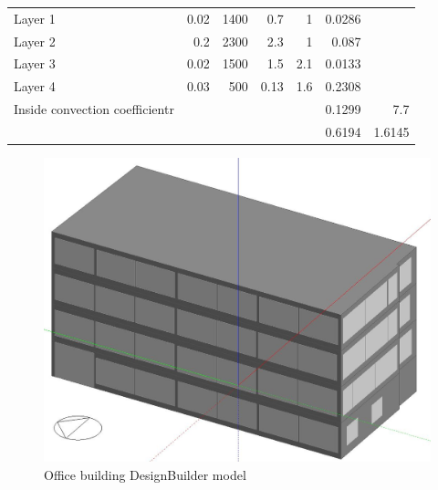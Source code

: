 \documentclass[a4paper, oneside]{discothesis}
\begin{document}
\begin{table}[h!]
\begin{tabular}{rrrrrrr}
			    \multicolumn{1}{l}{Layer 1} & 0.02 & 1400 & 0.7  & 1    & 0.0286 &  \\
			    \multicolumn{1}{l}{Layer 2} & 0.2  & 2300 & 2.3  & 1    & 0.087 &  \\
			    \multicolumn{1}{l}{Layer 3} & 0.02 & 1500 & 1.5  & 2.1  & 0.0133 &  \\
			    \multicolumn{1}{l}{Layer 4} & 0.03 & 500  & 0.13 & 1.6  & 0.2308 &  \\
			    \multicolumn{1}{l}{Inside convection coefficientr} &      &      &      &      & 0.1299 & 7.7 \\
			         &      &      &      &      & 0.6194 & 1.6145 \\
			    \bottomrule
			    \end{tabular}%
			  \label{tab:HonggerWallMat}%
			\end{table}%



			\begin{figure}[H]
			\centering
			\includegraphics[scale=0.4]{SumatraDesignBuilderModel.JPG}
			\caption{Office building DesignBuilder model}
			\label{fig:SumatraDB}
			\end{figure}
\end{document}
